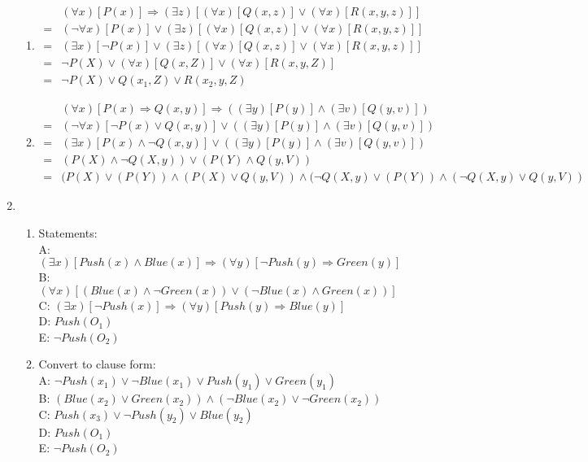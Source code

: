 \documentclass{article}
\begin{document}
\begin{enumerate}
\begin{enumerate}
	\item 
	\begin{align*}
		& (\forall x)[P(x)] \Rightarrow (\exists z)[(\forall x)[Q(x,z)] \lor (\forall x)[R(x,y,z)]] \\
		= & (\neg\forall x)[P(x)] \lor (\exists z)[(\forall x)[Q(x,z)] \lor (\forall x)[R(x,y,z)]] \\
		= & (\exists x)[\neg P(x)] \lor (\exists z)[(\forall x)[Q(x,z)] \lor (\forall x)[R(x,y,z)]] \\
		= & \neg P(X) \lor (\forall x)[Q(x,Z)] \lor (\forall x)[R(x,y,Z)] \\
		= & \neg P(X) \lor Q(x_1,Z) \lor R(x_2,y,Z) 
	\end{align*}
	
	\item 
	\begin{align*}
		& (\forall x)[P(x) \Rightarrow Q(x,y)] \Rightarrow ((\exists y)[P(y)] \land (\exists v)[Q(y,v)]) \\
		= & (\neg\forall x)[\neg P(x) \lor Q(x,y)] \lor ((\exists y)[P(y)] \land (\exists v)[Q(y,v)]) \\
		= & (\exists x)[P(x) \land \neg Q(x,y)] \lor ((\exists y)[P(y)] \land (\exists v)[Q(y,v)]) \\
		= & (P(X) \land \neg Q(X,y)) \lor (P(Y) \land Q(y,V)) \\
		= & (P(X) \lor (P(Y)) \land (P(X) \lor Q(y,V)) \land (\neg Q(X,y) \lor (P(Y)) \land (\neg Q(X,y) \lor Q(y,V)) 
	\end{align*}

\end{enumerate}


\item 
	\begin{enumerate}
	\item Statements:\\
	A: $(\exists x)[Push(x) \land Blue(x)] \Rightarrow (\forall y)[\neg Push(y) \Rightarrow Green(y)]$ \\
	B: $(\forall x)[(Blue(x) \land \neg Green(x)) \lor (\neg Blue(x) \land Green(x))]$ \\
	C: $(\exists x)[\neg Push(x)] \Rightarrow (\forall y)[Push(y) \Rightarrow Blue(y)]$ \\
	D: $Push(O_1)$ \\
	E: $\neg Push(O_2)$ 

	\item Convert to clause form:\\
	A: $\neg Push(x_1) \lor \neg Blue(x_1) \lor Push(y_1) \lor Green(y_1)$ \\
	B: $(Blue(x_2) \lor Green(x_2)) \land (\neg Blue(x_2) \lor \neg Green(x_2))$ \\
	C: $Push(x_3) \lor \neg Push(y_2) \lor Blue(y_2)$ \\
	D: $Push(O_1)$ \\
	E: $\neg Push(O_2)$ 
	

\end{enumerate}
\end{enumerate}
\end{document}
